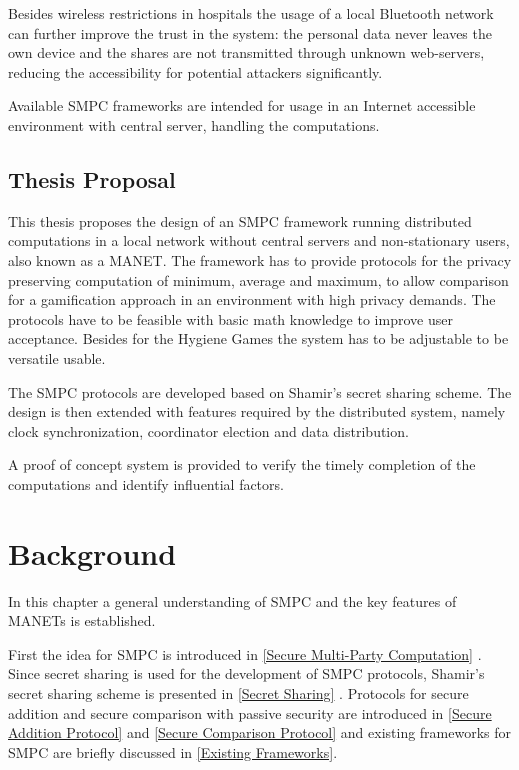 Besides wireless restrictions in hospitals the usage of a local Bluetooth network can further improve the trust in the system: the personal data never leaves the own device and the shares are not transmitted through unknown web-servers, reducing the accessibility for potential attackers significantly.

Available \gls{SMPC} frameworks are intended for usage in an Internet accessible environment with central server, handling the computations.

\section{Thesis Proposal}

This thesis proposes the design of an \gls{SMPC} framework running distributed computations in a local network without central servers and non-stationary users, also known as a \gls{MANET}. The framework has to provide protocols for the privacy preserving computation of minimum, average and maximum, to allow comparison for a gamification approach in an environment with high privacy demands. The protocols have to be feasible with basic math knowledge to improve user acceptance. Besides for the Hygiene Games the system has to be adjustable to be versatile usable.

The \gls{SMPC} protocols are developed based on Shamir's secret sharing scheme. The design is then extended with features required by the distributed system, namely clock synchronization, coordinator election and data distribution.

A proof of concept system is provided to verify the timely completion of the computations and identify influential factors.

\FloatBarrier

\chapter{Background} \label{Background}

In this chapter a general understanding of \gls{SMPC} and the key features of \glspl{MANET} is established.  

First the idea for \gls{SMPC} is introduced in \ref{Secure Multi-Party Computation} . Since secret sharing is used for the development of \gls{SMPC} protocols, Shamir's secret sharing scheme is presented in \ref{Secret Sharing} .
Protocols for secure addition and secure comparison with passive security are introduced in \ref{Secure Addition Protocol} and \ref{Secure Comparison Protocol} and existing frameworks for \gls{SMPC} are briefly discussed in \ref{Existing Frameworks}.

